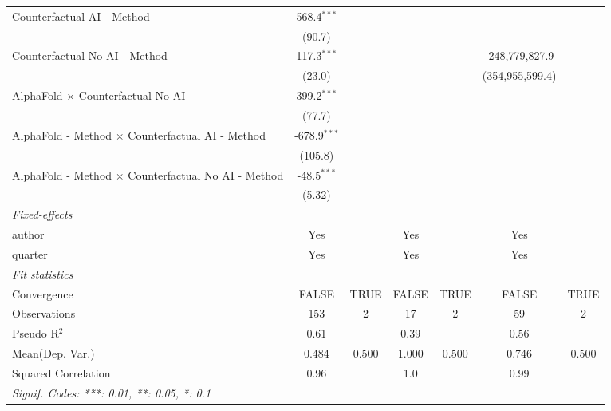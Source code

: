 \begin{tabular}{lcccccc}
   Counterfactual AI - Method                                 & 568.4$^{***}$  &      &         &      &                 &   \\   
                                                              & (90.7)         &      &         &      &                 &   \\   
   Counterfactual No AI - Method                              & 117.3$^{***}$  &      &         &      & -248,779,827.9  &   \\   
                                                              & (23.0)         &      &         &      & (354,955,599.4) &   \\   
   AlphaFold $\times$ Counterfactual No AI                    & 399.2$^{***}$  &      &         &      &                 &   \\   
                                                              & (77.7)         &      &         &      &                 &   \\   
   AlphaFold - Method $\times$ Counterfactual AI - Method     & -678.9$^{***}$ &      &         &      &                 &   \\   
                                                              & (105.8)        &      &         &      &                 &   \\   
   AlphaFold - Method $\times$ Counterfactual No AI - Method  & -48.5$^{***}$  &      &         &      &                 &   \\   
                                                              & (5.32)         &      &         &      &                 &   \\   
   \midrule
   \emph{Fixed-effects}\\
   author                                                     & Yes            &      & Yes     &      & Yes             & \\  
   quarter                                                    & Yes            &      & Yes     &      & Yes             & \\  
   \midrule
   \emph{Fit statistics}\\
   Convergence                                                &FALSE           & TRUE & FALSE   & TRUE & FALSE           & TRUE\\  
   Observations                                               & 153            & 2    & 17      & 2    & 59              & 2\\  
   Pseudo R$^2$                                               & 0.61           &      & 0.39    &      & 0.56            & \\  
Mean(Dep. Var.) & 0.484 & 0.500 & 1.000 & 0.500 & 0.746 & 0.500 \\
   Squared Correlation                                        & 0.96           &      & 1.0     &      & 0.99            & \\  
   \midrule \midrule
   \multicolumn{7}{l}{\emph{Signif. Codes: ***: 0.01, **: 0.05, *: 0.1}}\\
\end{tabular}
\par\endgroup

